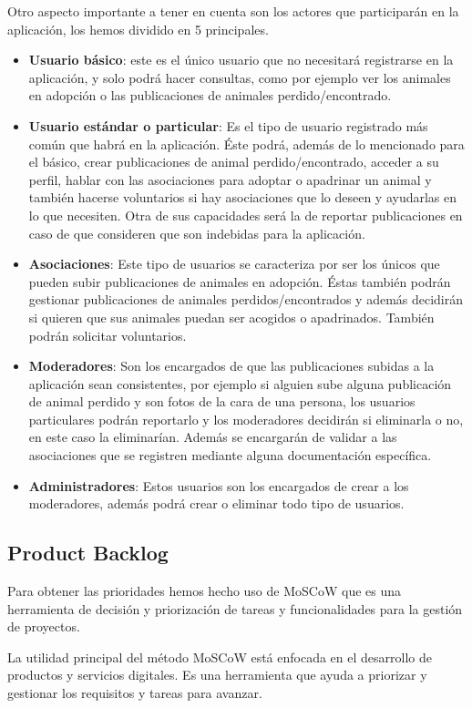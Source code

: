 Otro aspecto importante a tener en cuenta son los actores que participarán en la aplicación, los hemos dividido en 5 principales.
\begin{itemize}
	\item \textbf{Usuario básico}: este es el único usuario que no necesitará registrarse en la aplicación, y solo podrá hacer consultas, como por ejemplo ver los animales en adopción o las publicaciones de animales perdido/encontrado.
	\item \textbf{Usuario estándar o particular}: Es el tipo de usuario registrado más común que habrá en la aplicación. Éste podrá, además de lo mencionado para el básico, crear publicaciones de animal perdido/encontrado, acceder a su perfil, hablar con las asociaciones para adoptar o apadrinar un animal y también hacerse voluntarios si hay asociaciones que lo deseen y ayudarlas en lo que necesiten. Otra de sus capacidades será la de reportar publicaciones en caso de que consideren que son indebidas para la aplicación.
	\item \textbf{Asociaciones}: Este tipo de usuarios se caracteriza por ser los únicos que pueden subir publicaciones de animales en adopción. Éstas también podrán gestionar publicaciones de animales perdidos/encontrados y además decidirán si quieren que sus animales puedan ser acogidos o apadrinados. También podrán solicitar voluntarios.
	\item \textbf{Moderadores}: Son los encargados de que las publicaciones subidas a la aplicación sean consistentes, por ejemplo si alguien sube alguna publicación de animal perdido y son fotos de la cara de una persona, los usuarios particulares podrán reportarlo y los moderadores decidirán si eliminarla o no, en este caso la eliminarían. Además se encargarán de validar a las asociaciones que se registren mediante alguna documentación específica.
	\item \textbf{Administradores}: Estos usuarios son los encargados de crear a los moderadores, además podrá crear o eliminar todo tipo de usuarios.
	
\end{itemize}
\subsection{Product Backlog}
Para obtener las prioridades hemos hecho uso de MoSCoW \cite{moscow} que es una herramienta de decisión y priorización de tareas y funcionalidades para la gestión de proyectos.

La utilidad principal del método MoSCoW está enfocada en el desarrollo de productos y servicios digitales. Es una herramienta que ayuda a priorizar y gestionar los requisitos y tareas para avanzar.

